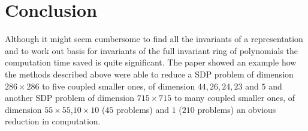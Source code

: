 \documentclass[]{article}
\begin{document}
\section*{Conclusion}
Although it might seem cumbersome to find all the invariants of a representation and to work out basis for invariants of the full invariant ring of polynomials the computation time saved is quite significant. The paper showed an example how the methods described above were able to reduce a SDP problem of dimension $286\times286$ to five coupled smaller ones, of dimension $44,26,24,23$ and $5$ and another SDP problem of dimension $715\times715$ to many coupled smaller ones, of dimension $55\times55$,$10\times10$ ($45$ problems) and $1$ ($210$ problems) an obvious reduction in computation.


\nocite{Gatermann_2004}

\printbibliography
\end{document}

